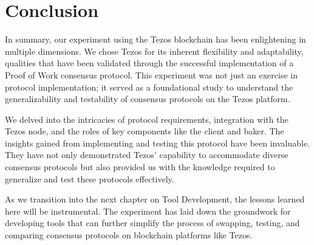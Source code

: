 \section{Conclusion}

In summary, our experiment using the Tezos blockchain has been enlightening in multiple dimensions. We chose Tezos for its inherent flexibility and adaptability, qualities that have been validated through the successful implementation of a Proof of Work consensus protocol. This experiment was not just an exercise in protocol implementation; it served as a foundational study to understand the generalizability and testability of consensus protocols on the Tezos platform. 

We delved into the intricacies of protocol requirements, integration with the Tezos node, and the roles of key components like the client and baker. The insights gained from implementing and testing this protocol have been invaluable. They have not only demonstrated Tezos' capability to accommodate diverse consensus protocols but also provided us with the knowledge required to generalize and test these protocols effectively.

As we transition into the next chapter on Tool Development, the lessons learned here will be instrumental. The experiment has laid down the groundwork for developing tools that can further simplify the process of swapping, testing, and comparing consensus protocols on blockchain platforms like Tezos. 

